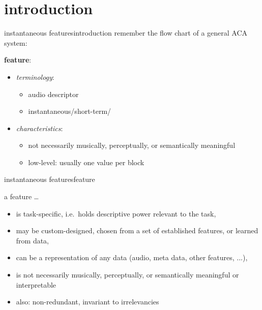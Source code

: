     \section[intro]{introduction}
        \begin{frame}{instantaneous features}{introduction}
            remember the flow chart of a general ACA system:
            \vspace{-3mm}
            \begin{figure}
                
            \end{figure}
            
            \vspace{-2mm}
            \pause
            \textbf{feature}:
            \begin{itemize}
                \item<2->   \textit{terminology}: 
                    \begin{itemize}
                        \item   audio descriptor
                        \item   instantaneous/short-term/
                    \end{itemize}
                \item<2->   \textit{characteristics}:
                    \begin{itemize}
                        \item	not necessarily musically, perceptually, or semantically meaningful
                        \item	low-level: usually one value per block
                    \end{itemize}
            \end{itemize}
        \end{frame}
        
        \begin{frame}{instantaneous features}{feature}
            \toremember{}
            \begin{block}{a feature \ldots}
            \begin{itemize}
                \item   is task-specific, i.e.\ holds descriptive power relevant to the task,
                \bigskip
                \item   may be custom-designed, chosen from a set of established features, or learned from data,
                \bigskip
                \item   can be a representation of any data (audio, meta data, other features, ...),
                \bigskip
                \item   is not necessarily musically, perceptually, or semantically meaningful or interpretable
                \bigskip
                \item   also: non-redundant, invariant to irrelevancies
            \end{itemize}
            \end{block}
        \end{frame}
        
